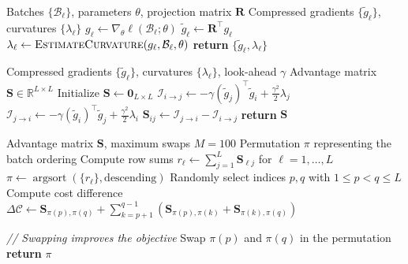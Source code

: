 \begin{algorithm}
\caption{Sketch (Phase 1)}
\begin{algorithmic}[1]
\REQUIRE Batches $\{\mathcal{B}_\ell\}$, parameters $\theta$, projection matrix $\mathbf{R}$
\ENSURE Compressed gradients $\{\tilde{g}_\ell\}$, curvatures $\{\lambda_\ell\}$
    \STATE $g_\ell \gets \nabla_\theta \ell(\mathcal{B}_\ell; \theta)$
    \STATE $\tilde{g}_\ell \gets \mathbf{R}^\top g_\ell$ 
    \STATE $\lambda_\ell \gets \textsc{EstimateCurvature}(g_\ell, \mathcal{B}_\ell, \theta)$ 
\ENDFOR
\STATE \textbf{return} $\{\tilde{g}_\ell, \lambda_\ell\}$
\end{algorithmic}
\end{algorithm}

\begin{algorithm}
\caption{Advantage (Phase 2)}
\begin{algorithmic}[1]
\REQUIRE Compressed gradients $\{\tilde{g}_\ell\}$, curvatures $\{\lambda_\ell\}$, look-ahead $\gamma$
\ENSURE Advantage matrix $\mathbf{S} \in \mathbb{R}^{L \times L}$
\STATE Initialize $\mathbf{S} \gets \mathbf{0}_{L \times L}$
        \STATE $\mathcal{I}_{i \to j} \gets -\gamma (\tilde{g}_j)^\top \tilde{g}_i + \frac{\gamma^2}{2} \lambda_j$
        \STATE $\mathcal{I}_{j \to i} \gets -\gamma (\tilde{g}_i)^\top \tilde{g}_j + \frac{\gamma^2}{2} \lambda_i$
        \STATE $\mathbf{S}_{ij} \gets \mathcal{I}_{j \to i} - \mathcal{I}_{i \to j}$
    \ENDFOR
\ENDFOR
\STATE \textbf{return} $\mathbf{S}$
\end{algorithmic}
\end{algorithm}

\begin{algorithm}
\caption{RSR (Phase 3)}
\begin{algorithmic}[1]
\REQUIRE Advantage matrix $\mathbf{S}$, maximum swaps $M = 100$
\ENSURE Permutation $\pi$ representing the batch ordering
\STATE Compute row sums $r_\ell \gets \sum_{j=1}^L \mathbf{S}_{\ell j}$ for $\ell=1,\dots,L$
\STATE $\pi \gets \operatorname{argsort}(\{r_\ell\}, \text{descending})$ 
    \STATE Randomly select indices $p, q$ with $1 \leq p < q \leq L$
    \STATE Compute cost difference $\Delta\mathcal{C} \gets \mathbf{S}_{\pi(p),\pi(q)} + \sum_{k=p+1}^{q-1} (\mathbf{S}_{\pi(p),\pi(k)} + \mathbf{S}_{\pi(k),\pi(q)})$
    \item[] \textit{// Swapping improves the objective}
        \STATE Swap $\pi(p)$ and $\pi(q)$ in the permutation
    \ENDIF
\ENDFOR
\STATE \textbf{return} $\pi$
\end{algorithmic}
\end{algorithm}

